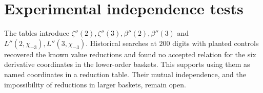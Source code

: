 

\section{Experimental independence tests}
The tables introduce $\zeta''(2),\zeta''(3),\beta''(2),\beta''(3)$ and
$L''(2,\chi_{-3}),L''(3,\chi_{-3})$. Historical searches at $200$ digits
with planted controls recovered the known value reductions and found no
accepted relation for the six derivative coordinates in the lower-order
baskets. This supports using them as named coordinates in a reduction
table. Their mutual independence, and the impossibility of reductions in
larger baskets, remain open.




